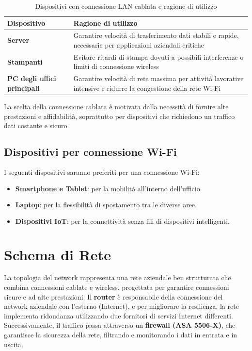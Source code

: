 \documentclass{assignment}
\begin{document}
\begin{table}[H]
    \centering
    \begin{tabular}{>{\bfseries}m{4cm}|m{10cm}}
        \toprule
        \rowcolor{lightblue}
        \textbf{Dispositivo} & \textbf{Ragione di utilizzo} \\
        \midrule
        Server & Garantire velocità di trasferimento dati stabili e rapide, necessarie per applicazioni aziendali critiche \\
        \midrule
        Stampanti & Evitare ritardi di stampa dovuti a possibili interferenze o limiti di connessione wireless \\
        \midrule
        PC degli uffici principali & Garantire velocità di rete massima per attività lavorative intensive e ridurre la congestione della rete Wi-Fi \\
        \bottomrule
    \end{tabular}
    \caption{Dispositivi con connessione LAN cablata e ragione di utilizzo}
    \end{table}
La scelta della connessione cablata è motivata dalla necessità di fornire alte prestazioni e affidabilità, soprattutto per dispositivi che richiedono un traffico dati costante e sicuro.

\subsection {Dispositivi per connessione Wi-Fi}

I seguenti dispositivi saranno preferiti per una connessione Wi-Fi:

\begin{itemize}
    \item \textbf{Smartphone e Tablet}: per la mobilità all'interno dell'ufficio.
    \item \textbf{Laptop}: per la flessibilità di spostamento tra le diverse aree.
    \item \textbf{Dispositivi IoT}: per la connettività senza fili di dispositivi intelligenti.
\end{itemize}


\section{Schema di Rete}

La topologia del network rappresenta una rete aziendale ben strutturata che combina connessioni cablate e wireless, progettata per garantire connessioni sicure e ad alte prestazioni. Il \textbf{router} è responsabile della connessione del network aziendale con l'esterno (Internet), e per migliorare la resilienza, la rete implementa ridondanza utilizzando due fornitori di servizi Internet differenti. Successivamente, il traffico passa attraverso un \textbf{firewall (ASA 5506-X)}, che garantisce la sicurezza della rete, filtrando e monitorando i dati in entrata e in uscita. 
\end{document}
